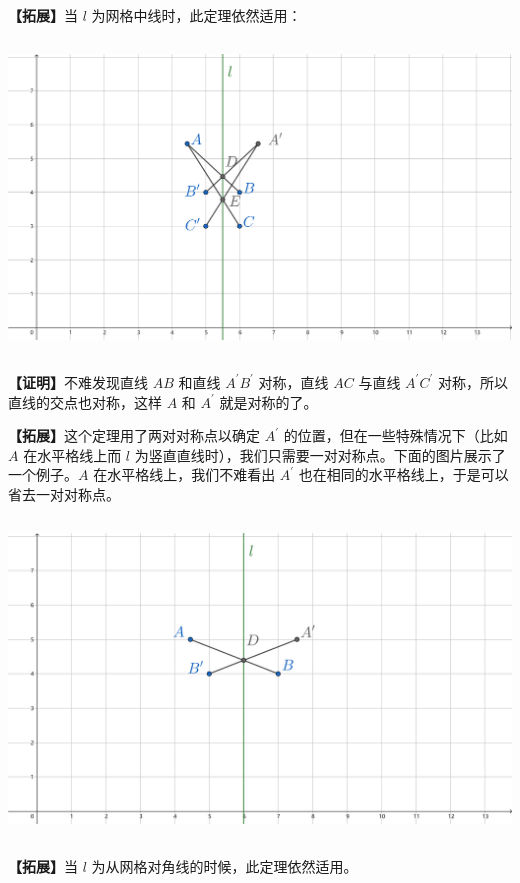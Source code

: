 \documentclass[UTF8]{article}
\begin{document}
\textbf{【拓展】}当 \(l\) 为网格中线时，此定理依然适用：

\includegraphics[width=5.76806in,height=3.27847in]{media/image2.png}

\textbf{【证明】}不难发现直线 \(AB\) 和直线 \(A^{'}B^{'}\) 对称，直线
\(AC\) 与直线 \(A^{'}C^{'}\) 对称，所以直线的交点也对称，这样 \(A\) 和
\(A^{'}\) 就是对称的了。

\textbf{【拓展】}这个定理用了两对对称点以确定 \(A^{'}\)
的位置，但在一些特殊情况下（比如 \(A\) 在水平格线上而 \(l\)
为竖直直线时），我们只需要一对对称点。下面的图片展示了一个例子。\(A\)
在水平格线上，我们不难看出 \(A^{'}\)
也在相同的水平格线上，于是可以省去一对对称点。

\includegraphics[width=5.76806in,height=3.33611in]{media/image3.png}

\textbf{【拓展】}当 \(l\) 为从网格对角线的时候，此定理依然适用。
\end{document}
